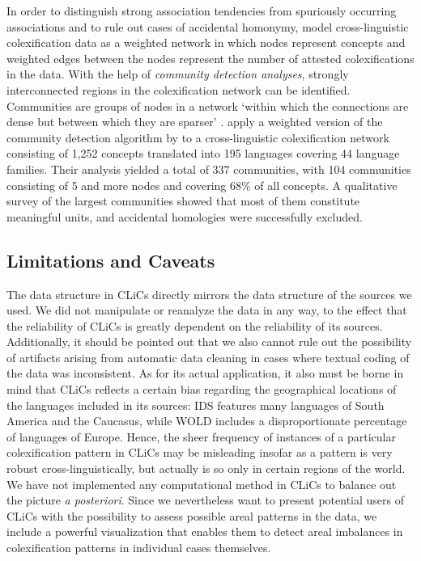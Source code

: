 In order to distinguish strong association tendencies from spuriously occurring associations and to
rule out cases of accidental homonymy,  model cross-linguistic colexification
data as a weighted network in which nodes represent concepts and weighted edges between the nodes
represent the number of attested colexifications in the data.  With the help of \emph{community
detection analyses}, strongly interconnected regions in the colexification network can be
identified. 
Communities are groups of nodes in a network
`within which the connections are dense but between which they are sparser' \cite{Newman2004}.
 apply a weighted version of the community detection algorithm by
 to a cross-linguistic colexification network consisting of 1,252 concepts
translated into 195 languages covering 44 language families. Their analysis yielded a total of 337
communities, with 104 communities consisting of 5 and more nodes and covering 68\% of all concepts.
A qualitative survey of the largest communities showed that most of them constitute meaningful
units, and accidental homologies were successfully excluded.

\subsection{Limitations and Caveats} \label{caveats}

The data structure in CLiCs directly mirrors the data structure of the sources we used. We did not manipulate or
reanalyze the data in any way, to the effect that the reliability of CLiCs is greatly dependent on
the reliability of its sources. Additionally, it should be pointed out that we also cannot rule out the
possibility of artifacts arising from automatic data cleaning in cases where textual coding of the
data was inconsistent. As for its actual application, it also must be borne in mind that CLiCs
reflects a certain bias regarding the geographical locations of the languages included in its
sources: IDS features many languages of South America and the Caucasus, while WOLD includes a
disproportionate percentage of languages of Europe. Hence, the sheer frequency of instances of a
particular colexification pattern in CLiCs may be misleading insofar as a pattern is very robust
cross-linguistically, but actually is so only in certain regions of the world. We have not
implemented any computational method in CLiCs to balance out the picture \emph{a posteriori}. Since
we nevertheless want to present potential users of CLiCs with the possibility to assess possible
areal patterns in the data, we include a powerful visualization that enables them to detect areal
imbalances in colexification patterns in individual cases themselves.


